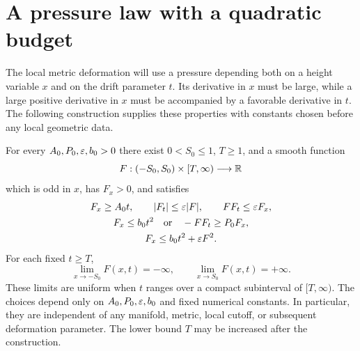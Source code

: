 \section{A pressure law with a quadratic budget}
\label{pressure:section}

The local metric deformation will use a pressure depending both on a height
variable $x$ and on the drift parameter $t$.  Its derivative in $x$ must be
large, while a large positive derivative in $x$ must be accompanied by a
favorable derivative in $t$.  The following construction supplies these
properties with constants chosen before any local geometric data.

\begin{theorem}\label{pressure:law}
For every $A_0,P_0,\varepsilon,b_0>0$ there exist $0<S_0\le1$, $T\ge1$, and a
smooth function
\[
 F:(-S_0,S_0)\times[T,\infty)\longrightarrow\mathbb R
\]
which is odd in $x$, has $F_x>0$, and satisfies
\begin{equation}\label{pressure:estimates}
\begin{gathered}
 F_x\ge A_0t,\qquad |F_t|\le\varepsilon|F|,\qquad FF_t\le\varepsilon F_x,\\
 F_x\le b_0t^2\quad\text{or}\quad -FF_t\ge P_0F_x,\\
 F_x\le b_0t^2+\varepsilon F^2.
\end{gathered}
\end{equation}
For each fixed $t\ge T$,
\[
 \lim_{x\to-S_0}F(x,t)=-\infty,
 \qquad \lim_{x\to S_0}F(x,t)=+\infty.
\]
These limits are uniform when $t$ ranges over a compact subinterval of
$[T,\infty)$.  The choices depend only on $A_0,P_0,\varepsilon,b_0$ and fixed
numerical constants.  In particular, they are independent of any manifold,
metric, local cutoff, or subsequent deformation parameter.  The lower bound
$T$ may be increased after the construction.
\end{theorem}

